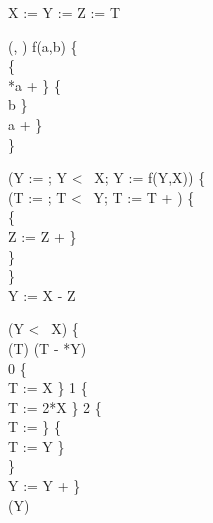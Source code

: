 \begin{algorithm}

	\Integer{} X  := \;
	\Integer{} Y  := \;
	\Integer{} Z  := \;
	\Integer{} T \;
	
	(, ) f(a,b) \{ \\
	\quad {} \{\\
	\quad \quad {} *a + \;
	\quad \}  \{\\
	\quad \quad {} b\;
	\quad \} \Elsee{}\\
	\quad \quad {} a + \;
	\quad \} \\
	\}\;

     (Y := ; Y < \, X; Y := f(Y,X))	 \{ \\
    \quad {} 
    (T := ; T < \, Y; T := T + )	 \{ \\
	\quad \quad {} \{\\
	\quad \quad \quad Z := Z + \;
	\quad \quad \} \\
	\quad \} \\
	\}\\
	
	
	\Integer{} Y  := X - Z\;
	
	 (Y < \, X)	 \{ \\
	\quad {}(T)\;
	\quad {}(T - *Y)\\
	\quad \quad {} 0 \{ \\
	\quad \quad \quad T := X\;
	\quad \quad\}  1 \{ \\
	\quad \quad \quad T := 2*X\;
	\quad \quad\}  2 \{ \\
	\quad \quad \quad T := \;
	\quad \quad\}  \{ \\
	\quad \quad \quad T := Y\;
	\quad \quad\}\\
	\quad \} \\
	\quad Y := Y + \;
	\}\\
	(Y)\;
\end{algorithm}

	
